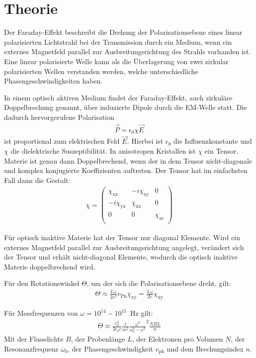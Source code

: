 \section{Theorie}
\label{sec:Theorie}

Der Faraday-Effekt beschreibt die Drehung der Polarisationsebene eines linear
polarisierten Lichtstrahl bei der Transmission durch ein Medium, wenn ein
externes Magnetfeld parallel zur Ausbreitungsrichtung des Strahls vorhanden
ist. Eine linear polarisierte Welle kann als die Überlagerung von zwei
zirkular polarisierten Wellen verstanden werden, welche unterschiedliche
Phasengeschwindigkeiten haben.

In einem optisch aktiven Medium findet der Faraday-Effekt, auch zirkuläre Doppelbrechung genannt, über induzierte
Dipole durch die EM-Welle statt. Die dadurch hervorgerufene Polarisation
\begin{align}
  \vec{P} = \epsilon_0 \chi \vec{E}
\end{align}
ist proportional zum elektrischen Feld $\vec{E}$. Hierbei ist $\epsilon_0$ die
Influenzkonstante und $\chi $ die dielektrische Suszeptibilität. In anisotropen
Kristallen ist $\chi$ ein Tensor. Materie ist genau dann Doppelbrechend, wenn der in dem
Tensor nicht-diagonale und komplex konjugierte Koeffizienten auftreten. Der Tensor
hat im einfachsten Fall dann die Gestalt:
\begin{align}
  \chi =
  \left( \begin{matrix}
         \chi_{\mathrm{xx}} & -i \chi_{\mathrm{xy}} & 0 \\
         -i \chi_{\mathrm{yx}} & \chi_{\mathrm{xx}} & 0 \\
         0 & 0 & \chi_{\mathrm{zz}}  \\
  \end{matrix} \right)
\end{align}

Für optisch inaktive Materie hat der Tensor nur diagonal Elemente. Wird ein
externes Magnetfeld parallel zur Ausbreitungsrichtung angelegt, verändert sich der Tensor und erhält
nicht-diagonal Elemente, wodurch die optisch inaktive Materie doppelbrechend wird.

Für den Rotationswinkel $\Theta$, um der sich die Polarisationsebene dreht, gilt:
\begin{align}
  \Theta \approx \frac{L \omega}{2 c^2}v_{\mathrm{Ph}} \chi_{\mathrm{xy}} = \frac{L \omega}{2 c}\chi_{\mathrm{xy}}
\end{align}

Für Messfrequenzen von $\omega = 10^{14}-10^{15}$\, Hz gilt:
\begin{align}
  \Theta \approx \frac{e^3_0}{2 \epsilon_0 c} \frac{1}{m^2}\frac{\omega^2}{\omega^2_0 - \omega^2}^2 \frac{NBL}{n} \label{eqn:theta}
\end{align}
Mit der Flussdichte $B$, der Probenlänge $L$, der Elektronen pro Volumen $N$, der Resonanzfrequenz $\omega_0$,
der Phasengeschwindigkeit $v_{\mathrm{ph}}$ und dem Brechungsindex $n$.

